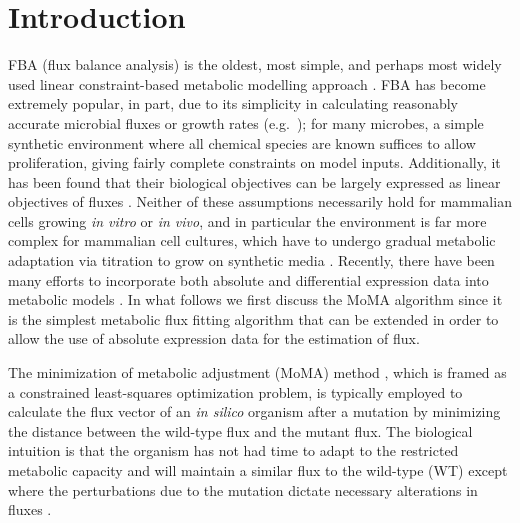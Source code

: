 \section{Introduction}

%
%
FBA (flux balance analysis) is the oldest, most simple, and perhaps
most widely used linear constraint-based metabolic modelling approach
\citep{Shestov2013a,Lewis2012}. FBA has become extremely popular, in
part, due to its simplicity in calculating reasonably accurate
microbial fluxes or growth rates
(e.g.\ \citealt{Schuetz2012,Fong2004_sb2013}); for
many microbes, a simple synthetic environment where all chemical
species are known suffices to allow proliferation, giving fairly
complete constraints on model inputs. Additionally, it has been found
that their biological objectives can be largely expressed as linear
objectives of fluxes \citep{Schuetz2012}.  Neither of these
assumptions necessarily hold for mammalian cells growing \textit{in
  vitro} or \textit{in vivo}, and in particular the environment is far
more complex for mammalian cell cultures, which have to undergo
gradual metabolic adaptation via titration to grow on synthetic media
\citep{Pirkmajer2011}. Recently, there have been many efforts to 
incorporate both absolute and differential expression data into metabolic 
models \citep{Blazier2012}. In what follows we first discuss the MoMA
algorithm since it is the simplest metabolic flux fitting algorithm that
can be extended in order to allow the use of absolute expression data for 
the estimation of flux.


The minimization of metabolic adjustment (MoMA) method
\citep{Segre2002}, which is framed as a constrained least-squares optimization
problem, is typically employed to calculate the flux vector of an
\textit{in silico} organism after a mutation by minimizing the distance
between the wild-type flux and the mutant flux. The biological
intuition is that the organism has not had time to adapt to the
restricted metabolic capacity and will maintain a similar flux to the
wild-type (WT) except where the perturbations due to the mutation
dictate necessary alterations in fluxes \citep{Shlomi2005}.

